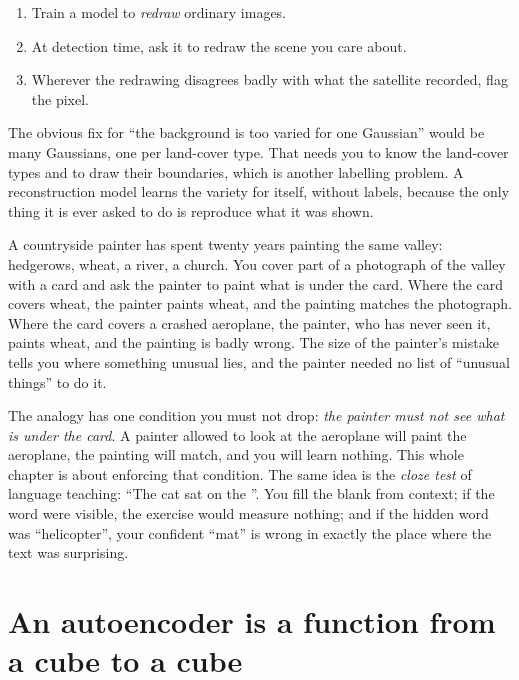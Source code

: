 \begin{enumerate}
\item Train a model to \emph{redraw} ordinary images.
\item At detection time, ask it to redraw the scene you care about.
\item Wherever the redrawing disagrees badly with what the satellite recorded, flag the pixel.
\end{enumerate}

The obvious fix for ``the background is too varied for one Gaussian'' would be many Gaussians, one per
land-cover type. That needs you to know the land-cover types and to draw their boundaries, which is
another labelling problem. A reconstruction model learns the variety for itself, without labels,
because the only thing it is ever asked to do is reproduce what it was shown.

\begin{analogy}
A countryside painter has spent twenty years painting the same valley: hedgerows, wheat, a river, a
church. You cover part of a photograph of the valley with a card and ask the painter to paint what
is under the card. Where the card covers wheat, the painter paints wheat, and the painting matches the
photograph. Where the card covers a crashed aeroplane, the painter, who has never seen it, paints
wheat, and the painting is badly wrong. The size of the painter's mistake tells you where something
unusual lies, and the painter needed no list of ``unusual things'' to do it.

The analogy has one condition you must not drop: \emph{the painter must not see what is under the
card}. A painter allowed to look at the aeroplane will paint the aeroplane, the painting will match,
and you will learn nothing. This whole chapter is about enforcing that condition. The same idea is
the \emph{cloze test} of language teaching: ``The cat sat on the \underline{\hspace{1.5em}}''. You
fill the blank from context; if the word were visible, the exercise would measure nothing; and if the
hidden word was ``helicopter'', your confident ``mat'' is wrong in exactly the place where the text was
surprising.
\end{analogy}

\section{An autoencoder is a function from a cube to a cube}\label{sec:recon:function}

